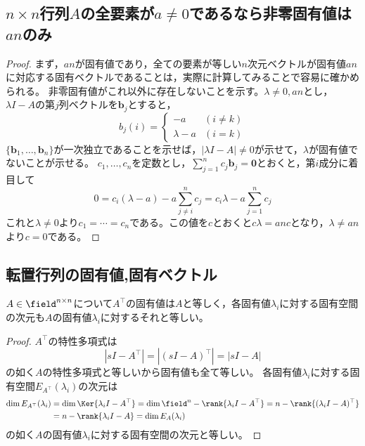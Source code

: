         \subsection{\texorpdfstring{$n\times n$}{n×n}行列\texorpdfstring{$A$}{A}の全要素が\texorpdfstring{$a\neq 0$}{a≠0}であるなら非零固有値は\texorpdfstring{$an$}{an}のみ}
            \begin{proof}
                \quad\par
                まず，$an$が固有値であり，全ての要素が等しい$n$次元ベクトルが固有値$an$に対応する固有ベクトルであることは，実際に計算してみることで容易に確かめられる。
                非零固有値がこれ以外に存在しないことを示す。$\lambda\neq 0,an$とし，$\lambda I-A$の第$j$列ベクトルを$\bm{b}_j$とすると，
                \[
                    b_j(i) =
                    \begin{cases}
                        -a & (i\neq k)\\
                        \lambda-a & (i=k)
                    \end{cases}
                \]
                $\{\bm{b}_1,\dotsc,\bm{b}_n\}$が一次独立であることを示せば，$\left|\lambda I-A\right|\neq 0$が示せて，$\lambda$が固有値でないことが示せる。
                $c_1,\dotsc,c_n$を定数とし，$\sum_{j=1}^{n}{c_j\bm{b}_j}=\bm{0}$とおくと，第$i$成分に着目して
                \[0 = c_i(\lambda-a) - a\sum_{j\neq i}^{n}{c_j} = c_i\lambda - a\sum_{j=1}^{n}{c_j}\]
                これと$\lambda\neq 0$より$c_1=\dotsb=c_n$である。この値を$c$とおくと$c\lambda = anc$となり，$\lambda\neq an$より$c=0$である。
            \end{proof}
        \subsection{転置行列の固有値,固有ベクトル}
            \begin{shadebox}
                $A\in\field^{n\times n}$について$A^\top$の固有値は$A$と等しく，各固有値$\lambda_i$に対する固有空間の次元も$A$の固有値$\lambda_i$に対するそれと等しい。
            \end{shadebox}
            \begin{proof}
                \quad\par
                $A^\top$の特性多項式は
                \[|sI-A^\top| = |(sI-A)^\top| = |sI-A|\]
                の如く$A$の特性多項式と等しいから固有値も全て等しい。
                各固有値$\lambda_i$に対する固有空間$E_{A^\top}(\lambda_i)$の次元は
                \begin{align*}
                    \dim E_{A^\top}(\lambda_i) &= \dim\Ker{\lambda_i I-A^\top} = \dim \field^n-\rank{\lambda_i I-A^\top} = n-\rank{(\lambda_i I-A)^\top}\\
                    &=n-\rank{\lambda_i I-A} = \dim E_A(\lambda_i)
                \end{align*}
                の如く$A$の固有値$\lambda_i$に対する固有空間の次元と等しい。
            \end{proof}

